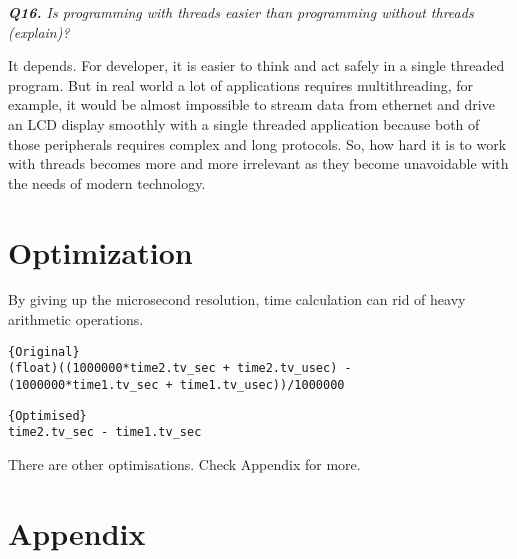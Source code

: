 \documentclass[11pt]{article}
\begin{document}
\vspace{5mm}
\textit{\textbf{Q16.} Is programming with threads easier than programming without threads (explain)?}
\vspace{5mm}

It depends. For developer, it is easier to think and act safely in a single threaded program. But in real world a lot of applications requires multithreading, for example, it would be almost impossible to stream data from ethernet and drive an LCD display smoothly with a single threaded application because both of those peripherals requires complex and long protocols. So, how hard it is to work with threads becomes more and more irrelevant as they become unavoidable with the needs of modern technology.

\section*{Optimization}

By giving up the microsecond resolution, time calculation can rid of heavy arithmetic operations.

\begin{lstlisting}[title=Original,frame=tlrb]{Original}
(float)((1000000*time2.tv_sec + time2.tv_usec) - 
(1000000*time1.tv_sec + time1.tv_usec))/1000000
\end{lstlisting}


\begin{lstlisting}[title=Optimised,frame=tlrb]{Optimised}
time2.tv_sec - time1.tv_sec
\end{lstlisting}

There are other optimisations. Check Appendix for more.


\newpage
\section*{Appendix}

\thispagestyle{empty}
\end{document}
